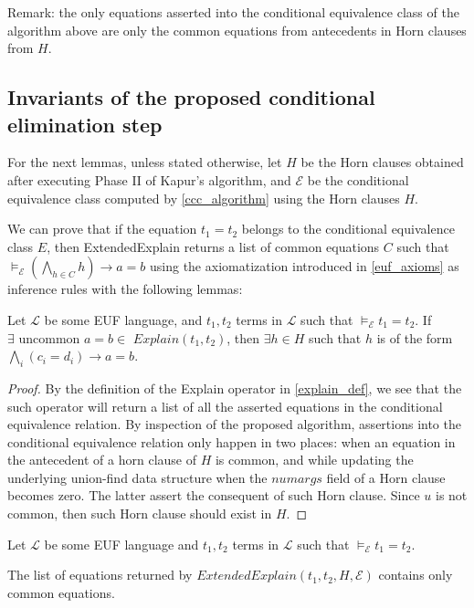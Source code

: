 Remark: the only equations asserted into the 
conditional equivalence class of the algorithm
above are only the common equations from 
antecedents in Horn clauses from $H$.

\subsection{Invariants of the proposed
conditional elimination step}

For the next lemmas, unless stated otherwise, let
$H$ be the Horn clauses obtained
after executing Phase II of Kapur's algorithm, and
$\mathcal{E}$ be the conditional equivalence class
computed by \ref{ccc_algorithm} using the Horn clauses
$H$.

We can prove that if the equation $t_1 = t_2$ belongs
to the conditional equivalence class $E$, 
then ExtendedExplain returns
a list of common equations $C$ such that
$\models_{\mathcal{E}} (\bigwedge_{h \in C} h) \rightarrow a = b$
using the axiomatization introduced in \ref{euf_axioms} as 
inference rules with the following lemmas:

\begin{lemma} \label{existence_horn_in_explain}
  Let $\mathcal{L}$ be some EUF language, 
  and $t_1, t_2$ terms in 
  $\mathcal{L}$ such that
  $\models_{\mathcal{E}} t_1 = t_2$.
  If $\exists \text{ uncommon } a = b \in$
  $Explain(t_1, t_2)$, then $\exists h \in H$ such 
  that $h$ is of the form 
  $\bigwedge_i (c_i = d_i) \rightarrow a = b$.
\end{lemma}

\begin{proof}
  By the definition of the Explain operator in \ref{explain_def},
  we see that the such operator will return a
  list of all the asserted equations in the conditional
  equivalence relation. By inspection of the proposed
  algorithm, assertions into the conditional equivalence
  relation only happen in two places: when an equation 
  in the antecedent of a horn clause of $H$ is common, 
  and while updating the underlying union-find data structure
  when the $numargs$ field of a Horn clause becomes
  zero. The latter assert the consequent of such Horn clause.
  Since $u$ is not common, then such Horn clause 
  should exist in $H$.
\end{proof}

\begin{lemma}\label{extended_explain_common_lemma}

  Let $\mathcal{L}$ be some EUF language 
  and $t_1, t_2$ terms in 
  $\mathcal{L}$ such that
  $\models_{\mathcal{E}} t_1 = t_2$.

  The list of equations returned by $ExtendedExplain(t_1, t_2, 
  H, \mathcal{E})$ contains only common equations.
\end{lemma}

